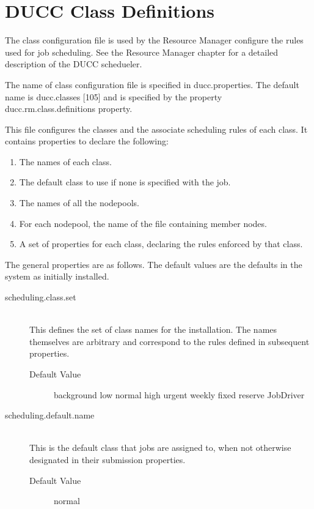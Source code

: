 \section{DUCC Class Definitions}


    The class configuration file is used by the Resource Manager configure the rules used for job 
    scheduling. See the Resource Manager chapter for a detailed description of the DUCC schedueler. 

    The name of class configuration file is specified in ducc.properties. The default name is 
    ducc.classes [105] and is specified by the property ducc.rm.class.definitions property. 

    This file configures the classes and the associate scheduling rules of each class. It contains 
    properties to declare the following: 
    \begin{enumerate}
      \item The names of each class. 
      \item The default class to use if none is specified with the job. 
      \item The names of all the nodepools. 
      \item For each nodepool, the name of the file containing member nodes. 
      \item A set of properties for each class, declaring the rules enforced by that class. 
    \end{enumerate}

    The general properties are as follows. The default values are the defaults in the system as initially 
    installed. 

    \begin{description}

      \item[scheduling.class.set] \hfill \\
        This defines the set of class names for the installation.  The names themselves are arbitrary
        and correspond to the rules defined in subsequent properties.

        \begin{description}
          \item[Default Value] background low normal high urgent weekly fixed reserve JobDriver 
        \end{description}
          
      \item[scheduling.default.name] \hfill \\
        This is the default class that jobs are assigned to, when not otherwise designated in their 
        submission properties. 
        \begin{description}
          \item[Default Value] normal 
        \end{description}
    \end{description}        
    
